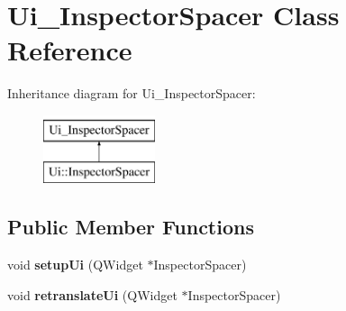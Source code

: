\hypertarget{class_ui___inspector_spacer}{}\section{Ui\+\_\+\+Inspector\+Spacer Class Reference}
\label{class_ui___inspector_spacer}
Inheritance diagram for Ui\+\_\+\+Inspector\+Spacer\+:\begin{figure}[H]
\begin{center}
\leavevmode
\includegraphics[height=2.000000cm]{class_ui___inspector_spacer}
\end{center}
\end{figure}
\subsection*{Public Member Functions}
\begin{DoxyCompactItemize}
\item 
\mbox{\label{class_ui___inspector_spacer_aae28b7e8e8e3d2c584782b203598619c}} 
void {\bfseries setup\+Ui} (Q\+Widget $\ast$Inspector\+Spacer)
\item 
\mbox{\label{class_ui___inspector_spacer_abd3a4f4f48bcf73b255a4c37e76e4c6c}} 
void {\bfseries retranslate\+Ui} (Q\+Widget $\ast$Inspector\+Spacer)
\end{DoxyCompactItemize}
